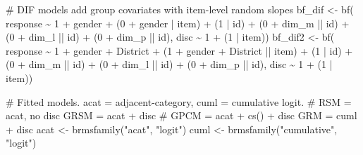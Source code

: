 \documentclass[
  man,
  floatsintext,
  longtable,
  nolmodern,
  notxfonts,
  notimes,
  colorlinks=true,linkcolor=blue,citecolor=blue,urlcolor=blue]{apa7}
\newenvironment{Shaded}{\begin{snugshade}}{\end{snugshade}}
\newcommand{\CommentTok}[1]{\textcolor[rgb]{0.37,0.37,0.37}{#1}}
\newcommand{\DecValTok}[1]{\textcolor[rgb]{0.68,0.00,0.00}{#1}}
\newcommand{\FunctionTok}[1]{\textcolor[rgb]{0.28,0.35,0.67}{#1}}
\newcommand{\NormalTok}[1]{\textcolor[rgb]{0.00,0.23,0.31}{#1}}
\newcommand{\OtherTok}[1]{\textcolor[rgb]{0.00,0.23,0.31}{#1}}
\newcommand{\SpecialCharTok}[1]{\textcolor[rgb]{0.37,0.37,0.37}{#1}}
\newcommand{\StringTok}[1]{\textcolor[rgb]{0.13,0.47,0.30}{#1}}
\begin{document}
\begin{Shaded}
\begin{Highlighting}[]
\CommentTok{\# DIF models add group covariates with item{-}level random slopes}
\NormalTok{bf\_dif }\OtherTok{\textless{}{-}} \FunctionTok{bf}\NormalTok{(}
\NormalTok{  response }\SpecialCharTok{\textasciitilde{}} \DecValTok{1} \SpecialCharTok{+}\NormalTok{ gender }\SpecialCharTok{+}\NormalTok{ (}\DecValTok{0} \SpecialCharTok{+}\NormalTok{ gender }\SpecialCharTok{|}\NormalTok{ item) }\SpecialCharTok{+}\NormalTok{ (}\DecValTok{1} \SpecialCharTok{|}\NormalTok{ id) }\SpecialCharTok{+}
\NormalTok{    (}\DecValTok{0} \SpecialCharTok{+}\NormalTok{ dim\_m }\SpecialCharTok{||}\NormalTok{ id) }\SpecialCharTok{+}\NormalTok{ (}\DecValTok{0} \SpecialCharTok{+}\NormalTok{ dim\_l }\SpecialCharTok{||}\NormalTok{ id) }\SpecialCharTok{+}\NormalTok{ (}\DecValTok{0} \SpecialCharTok{+}\NormalTok{ dim\_p }\SpecialCharTok{||}\NormalTok{ id),}
\NormalTok{  disc }\SpecialCharTok{\textasciitilde{}} \DecValTok{1} \SpecialCharTok{+}\NormalTok{ (}\DecValTok{1} \SpecialCharTok{|}\NormalTok{ item))}
\NormalTok{bf\_dif2 }\OtherTok{\textless{}{-}} \FunctionTok{bf}\NormalTok{(}
\NormalTok{  response }\SpecialCharTok{\textasciitilde{}} \DecValTok{1} \SpecialCharTok{+}\NormalTok{ gender }\SpecialCharTok{+}\NormalTok{ District }\SpecialCharTok{+}\NormalTok{ (}\DecValTok{1} \SpecialCharTok{+}\NormalTok{ gender }\SpecialCharTok{+}\NormalTok{ District }\SpecialCharTok{||}\NormalTok{ item) }\SpecialCharTok{+}
\NormalTok{    (}\DecValTok{1} \SpecialCharTok{|}\NormalTok{ id) }\SpecialCharTok{+}\NormalTok{ (}\DecValTok{0} \SpecialCharTok{+}\NormalTok{ dim\_m }\SpecialCharTok{||}\NormalTok{ id) }\SpecialCharTok{+}\NormalTok{ (}\DecValTok{0} \SpecialCharTok{+}\NormalTok{ dim\_l }\SpecialCharTok{||}\NormalTok{ id) }\SpecialCharTok{+}\NormalTok{ (}\DecValTok{0} \SpecialCharTok{+}\NormalTok{ dim\_p }\SpecialCharTok{||}\NormalTok{ id),}
\NormalTok{  disc }\SpecialCharTok{\textasciitilde{}} \DecValTok{1} \SpecialCharTok{+}\NormalTok{ (}\DecValTok{1} \SpecialCharTok{|}\NormalTok{ item))}

\CommentTok{\# Fitted models. acat = adjacent{-}category, cuml = cumulative logit.}
\CommentTok{\#   RSM  = acat, no disc        GRSM = acat + disc}
\CommentTok{\#   GPCM = acat + cs() + disc   GRM  = cuml + disc}
\NormalTok{acat }\OtherTok{\textless{}{-}} \FunctionTok{brmsfamily}\NormalTok{(}\StringTok{"acat"}\NormalTok{, }\StringTok{"logit"}\NormalTok{)}
\NormalTok{cuml }\OtherTok{\textless{}{-}} \FunctionTok{brmsfamily}\NormalTok{(}\StringTok{"cumulative"}\NormalTok{, }\StringTok{"logit"}\NormalTok{)}


\end{Highlighting}
\end{Shaded}
\end{document}
